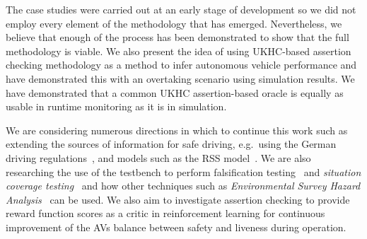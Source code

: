 The case studies were carried out at an early stage of development so we did not employ every element of the methodology that has emerged. Nevertheless, we believe that enough of the process has been demonstrated to show that the full methodology is viable.
%
We also present the idea of using UKHC-based assertion checking methodology as a method to infer autonomous vehicle performance and have demonstrated this with an overtaking scenario using simulation results. We have demonstrated that a common UKHC assertion-based oracle is equally as usable in runtime monitoring as it is in simulation.


We are considering numerous directions in which to continue this work such as extending the sources of information for safe driving, e.g.\ using the German driving regulations~\cite{acountability}, and models such as the RSS model~\cite{RSS_Shalev_Shwartz2017,RSS2_Koopman2019}. We are also researching the use of the testbench to perform falsification testing~\cite{corso2020survey, akazaki2017causality} and \emph{situation coverage testing}~\cite{alexander2015} and how other techniques such as \emph{Environmental Survey Hazard Analysis}~\cite{harper2021towards} can be used. We also aim to investigate assertion checking to provide reward function scores as a critic in reinforcement learning for continuous improvement of the AVs balance between safety and liveness during operation.



    

